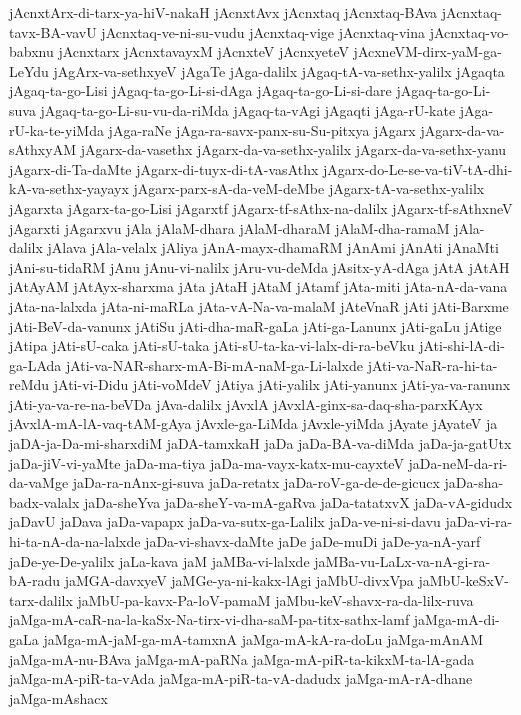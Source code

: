 {jAcnxtArx-di-tarx-ya-hiV-nakaH
jAcnxtAvx
jAcnxtaq
jAcnxtaq-BAva
jAcnxtaq-tavx-BA-vavU
jAcnxtaq-ve-ni-su-vudu
jAcnxtaq-vige
jAcnxtaq-vina
jAcnxtaq-vo-babxnu
jAcnxtarx
jAcnxtavayxM
jAcnxteV
jAcnxyeteV
jAcxneVM-dirx-yaM-ga-LeYdu
jAgArx-va-sethxyeV
jAgaTe
jAga-dalilx
jAgaq-tA-va-sethx-yalilx
jAgaqta
jAgaq-ta-go-Lisi
jAgaq-ta-go-Li-si-dAga
jAgaq-ta-go-Li-si-dare
jAgaq-ta-go-Li-suva
jAgaq-ta-go-Li-su-vu-da-riMda
jAgaq-ta-vAgi
jAgaqti
jAga-rU-kate
jAga-rU-ka-te-yiMda
jAga-raNe
jAga-ra-savx-panx-su-Su-pitxya
jAgarx
jAgarx-da-va-sAthxyAM
jAgarx-da-vasethx
jAgarx-da-va-sethx-yalilx
jAgarx-da-va-sethx-yanu
jAgarx-di-Ta-daMte
jAgarx-di-tuyx-di-tA-vasAthx
jAgarx-do-Le-se-va-tiV-tA-dhi-kA-va-sethx-yayayx
jAgarx-parx-sA-da-veM-deMbe
jAgarx-tA-va-sethx-yalilx
jAgarxta
jAgarx-ta-go-Lisi
jAgarxtf
jAgarx-tf-sAthx-na-dalilx
jAgarx-tf-sAthxneV
jAgarxti
jAgarxvu
jAla
jAlaM-dhara
jAlaM-dharaM
jAlaM-dha-ramaM
jAla-dalilx
jAlava
jAla-velalx
jAliya
jAnA-mayx-dhamaRM
jAnAmi
jAnAti
jAnaMti
jAni-su-tidaRM
jAnu
jAnu-vi-nalilx
jAru-vu-deMda
jAsitx-yA-dAga
jAtA
jAtAH
jAtAyAM
jAtAyx-sharxma
jAta
jAtaH
jAtaM
jAtamf
jAta-miti
jAta-nA-da-vana
jAta-na-lalxda
jAta-ni-maRLa
jAta-vA-Na-va-malaM
jAteVnaR
jAti
jAti-Barxme
jAti-BeV-da-vanunx
jAtiSu
jAti-dha-maR-gaLa
jAti-ga-Lanunx
jAti-gaLu
jAtige
jAtipa
jAti-sU-caka
jAti-sU-taka
jAti-sU-ta-ka-vi-lalx-di-ra-beVku
jAti-shi-lA-di-ga-LAda
jAti-va-NAR-sharx-mA-Bi-mA-naM-ga-Li-lalxde
jAti-va-NaR-ra-hi-ta-reMdu
jAti-vi-Didu
jAti-voMdeV
jAtiya
jAti-yalilx
jAti-yanunx
jAti-ya-va-ranunx
jAti-ya-va-re-na-beVDa
jAva-dalilx
jAvxlA
jAvxlA-ginx-sa-daq-sha-parxKAyx
jAvxlA-mA-lA-vaq-tAM-gAya
jAvxle-ga-LiMda
jAvxle-yiMda
jAyate
jAyateV
ja
jaDA-ja-Da-mi-sharxdiM
jaDA-tamxkaH
jaDa
jaDa-BA-va-diMda
jaDa-ja-gatUtx
jaDa-jiV-vi-yaMte
jaDa-ma-tiya
jaDa-ma-vayx-katx-mu-cayxteV
jaDa-neM-da-ri-da-vaMge
jaDa-ra-nAnx-gi-suva
jaDa-retatx
jaDa-roV-ga-de-de-gicucx
jaDa-sha-badx-valalx
jaDa-sheYva
jaDa-sheY-va-mA-gaRva
jaDa-tatatxvX
jaDa-vA-gidudx
jaDavU
jaDava
jaDa-vapapx
jaDa-va-sutx-ga-Lalilx
jaDa-ve-ni-si-davu
jaDa-vi-ra-hi-ta-nA-da-na-lalxde
jaDa-vi-shavx-daMte
jaDe
jaDe-muDi
jaDe-ya-nA-yarf
jaDe-ye-De-yalilx
jaLa-kava
jaM
jaMBa-vi-lalxde
jaMBa-vu-LaLx-va-nA-gi-ra-bA-radu
jaMGA-davxyeV
jaMGe-ya-ni-kakx-lAgi
jaMbU-divxVpa
jaMbU-keSxV-tarx-dalilx
jaMbU-pa-kavx-Pa-loV-pamaM
jaMbu-keV-shavx-ra-da-lilx-ruva
jaMga-mA-caR-na-la-kaSx-Na-tirx-vi-dha-saM-pa-titx-sathx-lamf
jaMga-mA-di-gaLa
jaMga-mA-jaM-ga-mA-tamxnA
jaMga-mA-kA-ra-doLu
jaMga-mAnAM
jaMga-mA-nu-BAva
jaMga-mA-paRNa
jaMga-mA-piR-ta-kikxM-ta-lA-gada
jaMga-mA-piR-ta-vAda
jaMga-mA-piR-ta-vA-dadudx
jaMga-mA-rA-dhane
jaMga-mAshacx
}
